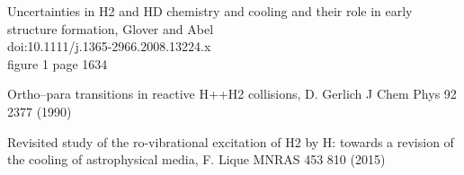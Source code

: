 \documentclass[10pt, a4paper]{report}
\numberwithin{equation}{subsection}
\begin{document}
\begin{thebibliography}{}
Uncertainties in H2 and HD chemistry and cooling and their role in early structure formation, Glover and Abel
\\doi:10.1111/j.1365-2966.2008.13224.x
\\figure 1 page 1634

Ortho–para transitions in reactive H++H2 collisions, D. Gerlich J Chem Phys 92 2377 (1990)

Revisited study of the ro-vibrational excitation of H2 by H: towards a revision of the cooling of astrophysical media, F. Lique MNRAS 453 810 (2015)



\end{thebibliography}
\end{document}
